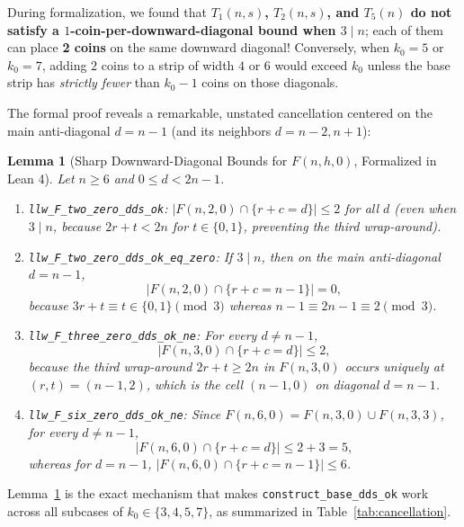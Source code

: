 \documentclass[11pt,a4paper]{article}
\newtheorem{lemma}[theorem]{Lemma}
\theoremstyle{remark}
\begin{document}
During formalization, we found that \textbf{$T_1(n, s)$, $T_2(n, s)$, and $T_5(n)$ do not satisfy a $1$-coin-per-downward-diagonal bound when $3 \mid n$}; each of them can place \textbf{2 coins} on the same downward diagonal! Conversely, when $k_0 = 5$ or $k_0 = 7$, adding $2$ coins to a strip of width $4$ or $6$ would exceed $k_0$ unless the base strip has \emph{strictly fewer} than $k_0 - 1$ coins on those diagonals.

The formal proof reveals a remarkable, unstated cancellation centered on the main anti-diagonal $d = n - 1$ (and its neighbors $d = n - 2, n + 1$):

\begin{lemma}[Sharp Downward-Diagonal Bounds for $F(n, h, 0)$, Formalized in Lean 4]
\label{lem:sharp-F}
Let $n \ge 6$ and $0 \le d < 2n - 1$.
\begin{enumerate}[nosep,label=(\alph*)]
  \item \texttt{llw\_F\_two\_zero\_dds\_ok}: $|F(n, 2, 0) \cap \{r + c = d\}| \le 2$ for all $d$ (even when $3 \mid n$, because $2r + t < 2n$ for $t \in \{0, 1\}$, preventing the third wrap-around).
  \item \texttt{llw\_F\_two\_zero\_dds\_ok\_eq\_zero}: If $3 \mid n$, then on the main anti-diagonal $d = n - 1$,
  \[
    |F(n, 2, 0) \cap \{r + c = n - 1\}| = 0,
  \]
  because $3r + t \equiv t \in \{0, 1\} \pmod 3$ whereas $n - 1 \equiv 2n - 1 \equiv 2 \pmod 3$.
  \item \texttt{llw\_F\_three\_zero\_dds\_ok\_ne}: For \emph{every} $d \ne n - 1$,
  \[
    |F(n, 3, 0) \cap \{r + c = d\}| \le 2,
  \]
  because the third wrap-around $2r + t \ge 2n$ in $F(n, 3, 0)$ occurs uniquely at $(r, t) = (n - 1, 2)$, which is the cell $(n - 1, 0)$ on diagonal $d = n - 1$.
  \item \texttt{llw\_F\_six\_zero\_dds\_ok\_ne}: Since $F(n, 6, 0) = F(n, 3, 0) \cup F(n, 3, 3)$, for \emph{every} $d \ne n - 1$,
  \[
    |F(n, 6, 0) \cap \{r + c = d\}| \le 2 + 3 = 5,
  \]
  whereas for $d = n - 1$, $|F(n, 6, 0) \cap \{r + c = n - 1\}| \le 6$.
\end{enumerate}
\end{lemma}

Lemma~\ref{lem:sharp-F} is the exact mechanism that makes \texttt{construct\_base\_dds\_ok} work across all subcases of $k_0 \in \{3, 4, 5, 7\}$, as summarized in Table~\ref{tab:cancellation}.
\end{document}
